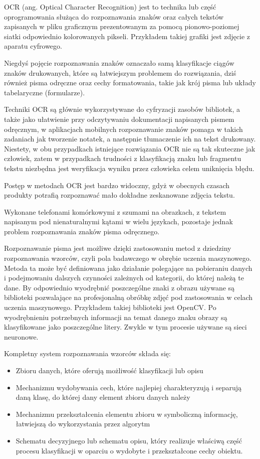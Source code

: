 \documentclass[brudnopis]{xmgr}
\begin{document}
OCR (ang. Optical Character Recognition) jest to technika lub część oprogramowania służąca do rozpoznawania znaków oraz całych tekstów zapisanych w pliku graficznym prezentowanym za pomocą pionowo-poziomej siatki odpowiednio kolorowanych pikseli. Przykładem takiej grafiki jest zdjęcie z aparatu cyfrowego. 

Niegdyś pojęcie rozpoznawania znaków oznaczało samą klasyfikacje ciągów znaków drukowanych, które są łatwiejszym problemem do rozwiązania, dziś również pisma odręczne oraz cechy formatowania, takie jak krój pisma lub układy tabelaryczne (formularze).

Techniki OCR są głównie wykorzystywane do cyfryzacji zasobów bibliotek, a także jako ułatwienie przy odczytywaniu dokumentacji napisanych pismem odręcznym, w aplikacjach mobilnych rozpoznawanie znaków pomaga w takich zadaniach jak tworzenie notatek, a następnie tłumaczenie ich na tekst drukowany. Niestety, w obu przypadkach istniejące rozwiązania OCR nie są tak skuteczne jak człowiek, zatem w przypadkach trudności z klasyfikacją znaku lub fragmentu tekstu niezbędna jest weryfikacja wyniku przez człowieka celem uniknięcia błędu.

Postęp w metodach OCR jest bardzo widoczny, gdyż w obecnych czasach produkty potrafią rozpoznawać mało dokładne zeskanowane zdjęcia tekstu.

Wykonane telefonami komórkowymi z szumami na obrazkach, z tekstem napisanym pod nienaturalnymi kątami w wielu językach, pozostaje jednak problem rozpoznawania znaków pisma odręcznego.

Rozpoznawanie pisma jest możliwe dzięki zastosowaniu metod z dziedziny rozpoznawania wzorców, czyli pola badawczego w obrębie uczenia maszynowego. Metoda ta może być definiowana jako działanie polegające na pobieraniu danych i podejmowaniu dalszych czynności zależnych od kategorii, do której należą te dane. By odpowiednio wyodrębnić poszczególne znaki z obrazu używane są biblioteki pozwalające na profesjonalną obróbkę zdjęć pod zastosowania w celach uczenia maszynowego. Przykładem takiej biblioteki jest OpenCV. Po wyodrębnieniu potrzebnych informacji na temat danego znaku obrazy są klasyfikowane jako poszczególne litery. Zwykle w tym procesie używane są sieci neuronowe.

Kompletny system rozpoznawania wzorców składa się:
\begin{itemize}
\item
Zbioru danych, które oferują możliwość klasyfikacji lub opisu
\item
Mechanizmu wydobywania cech, które najlepiej charakteryzują i separują daną klasę, do której dany element zbioru danych należy
\item
Mechanizmu przekształcenia elementu zbioru w symboliczną informację, łatwiejszą do wykorzystania przez algorytm
\item
Schematu decyzyjnego lub schematu opisu, który realizuje właściwą część procesu klasyfikacji w oparciu o wydobyte i przekształcone cechy obiektu.
\end{itemize}
\end{document}
